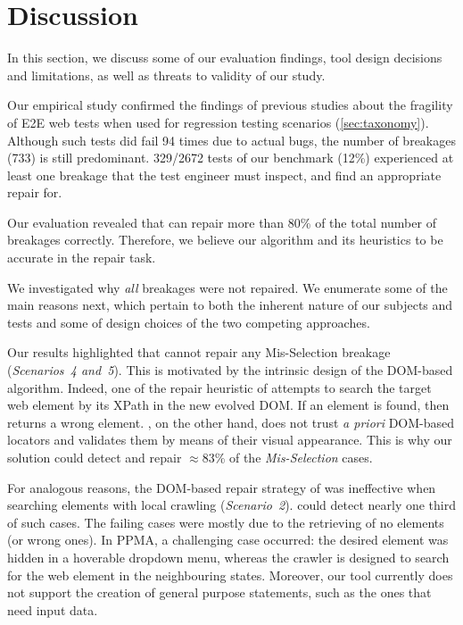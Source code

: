 \section{Discussion}\label{sec:discussion} 

In this section, we discuss some of our evaluation findings, tool design decisions and limitations, as well as threats to validity of our study.

 Our empirical study confirmed the findings of previous studies about the fragility of E2E web tests when used for regression testing scenarios (\autoref{sec:taxonomy}). 
Although such tests did fail 94 times due to actual bugs, the number of breakages (733) is still predominant. 329/2672 tests of our benchmark (12\%) experienced at least one breakage that the test engineer must inspect, and find an appropriate repair for. 

Our evaluation revealed that \tool can repair more than 80\% of the total number of breakages correctly. Therefore, we believe our algorithm and its heuristics to be accurate in the repair task.

We investigated why \emph{all} breakages were not repaired. We enumerate some of the main reasons next, which pertain to both the inherent nature of our subjects and tests and some of design choices of the two competing approaches. 

Our results highlighted that \water cannot repair any Mis-Selection breakage (\textit{Scenarios~4 and~5}). This is motivated by the intrinsic design of the DOM-based algorithm. Indeed, one of the repair heuristic of \water attempts to search the target web element by its XPath in the new evolved DOM. If an element is found, then \water returns a wrong element. \tool, on the other hand, does not trust \textit{a priori} DOM-based locators and validates them by means of their visual appearance. This is why our solution could detect and repair $\approx$83\% of the \textit{Mis-Selection} cases. 

For analogous reasons, the DOM-based repair strategy of \water was ineffective when searching elements with local crawling (\textit{Scenario~2}). \tool could detect nearly one third of such cases. The failing cases were mostly due to the retrieving of no elements (or wrong ones). In PPMA, a challenging case occurred: the desired element was hidden in a hoverable dropdown menu, whereas the crawler is designed to search for the web element in the neighbouring states. Moreover, our tool currently does not support the creation of general purpose statements, such as the ones that need input data. %

